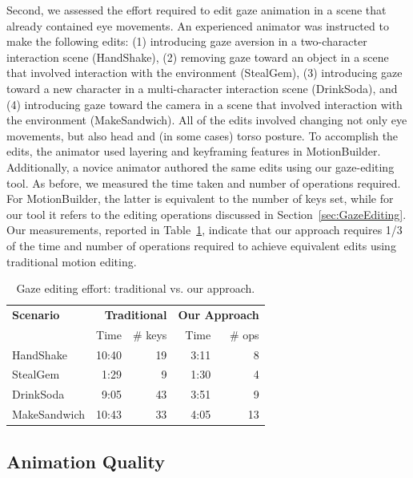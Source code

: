 Second, we assessed the effort required to edit gaze animation in a scene that already contained eye movements. An experienced animator was instructed to make the following edits: (1) introducing gaze aversion in a two-character interaction scene (HandShake), (2) removing gaze toward an object in a scene that involved interaction with the environment (StealGem), (3) introducing gaze toward a new character in a multi-character interaction scene (DrinkSoda), and (4) introducing gaze toward the camera in a scene that involved interaction with the environment (MakeSandwich). All of the edits involved changing not only eye movements, but also head and (in some cases) torso posture. To accomplish the edits, the animator used layering and keyframing features in MotionBuilder. Additionally, a novice animator authored the same edits using our gaze-editing tool. As before, we measured the time taken and number of operations required. For MotionBuilder, the latter is equivalent to the number of keys set, while for our tool it refers to the editing operations discussed in Section~\ref{sec:GazeEditing}. Our measurements, reported in Table~\ref{tab:GazeEditingEffortResults}, indicate that our approach requires 1/3 of the time and number of operations required to achieve equivalent edits using traditional motion editing.

\begin{table}
\small
\centering
\def\arraystretch{1.5}
\begin{tabular}{lrrrr}
\hline
\textbf{Scenario} & \multicolumn{2}{r}{\textbf{Traditional}} & \multicolumn{2}{r}{\textbf{Our Approach}} \\
\cline{2-5}
& Time & \# keys & Time & \# ops  \\
\hline
HandShake & 10:40 & 19 & 3:11 & 8 \\
StealGem & 1:29 & 9 & 1:30 & 4 \\
DrinkSoda & 9:05 & 43 & 3:51 & 9 \\
MakeSandwich & 10:43 & 33 & 4:05 & 13 \\
\hline
\end{tabular}
\caption{Gaze editing effort: traditional vs. our approach.}
\label{tab:GazeEditingEffortResults}
\end{table}

\subsection{Animation Quality}
\label{sec:GazeAnimationQualityEvaluation}

